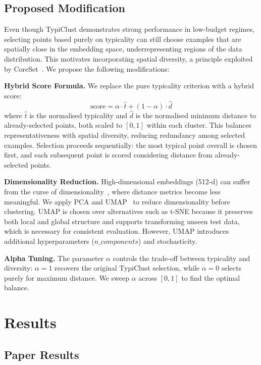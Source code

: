 \documentclass[10pt, twocolumn]{article}
\begin{document}
\subsection{Proposed Modification}

Even though TypiClust demonstrates strong performance in low-budget regimes, selecting points based purely on typicality can still choose examples that are spatially close in the embedding space, underrepresenting regions of the data distribution. This motivates incorporating spatial diversity, a principle exploited by CoreSet~\cite{sener2018active}. We propose the following modifications:

\textbf{Hybrid Score Formula.} We replace the pure typicality criterion with a hybrid score:
\begin{equation}
    \text{score} = \alpha \cdot \hat{t} + (1 - \alpha) \cdot \hat{d}
\end{equation}
where $\hat{t}$ is the normalised typicality and $\hat{d}$ is the normalised minimum distance to already-selected points, both scaled to $[0,1]$ within each cluster. This balances representativeness with spatial diversity, reducing redundancy among selected examples. Selection proceeds sequentially: the most typical point overall is chosen first, and each subsequent point is scored considering distance from already-selected points.

\textbf{Dimensionality Reduction.} High-dimensional embeddings (512-d) can suffer from the curse of dimensionality~\cite{aggarwal2001surprising}, where distance metrics become less meaningful. We apply PCA and UMAP~\cite{mcinnes2018umap} to reduce dimensionality before clustering. UMAP is chosen over alternatives such as t-SNE because it preserves both local and global structure and supports transforming unseen test data, which is necessary for consistent evaluation. However, UMAP introduces additional hyperparameters ($n\_components$) and stochasticity.

\textbf{Alpha Tuning.} The parameter $\alpha$ controls the trade-off between typicality and diversity: $\alpha = 1$ recovers the original TypiClust selection, while $\alpha = 0$ selects purely for maximum distance. We sweep $\alpha$ across $[0, 1]$ to find the optimal balance.

\section{Results}

\subsection{Paper Results}
\end{document}
